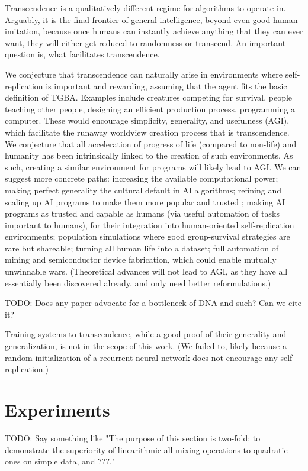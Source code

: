 \documentclass{article}
\begin{document}
Transcendence is a qualitatively different regime for algorithms to operate in. Arguably, it is the final frontier of general intelligence, beyond even good human imitation, because once humans can instantly achieve anything that they can ever want, they will either get reduced to randomness or transcend. An important question is, what facilitates transcendence.

We conjecture that transcendence can naturally arise in environments where self-replication is important and rewarding, assuming that the agent fits the basic definition of TGBA. Examples include creatures competing for survival, people teaching other people, designing an efficient production process, programming a computer. These would encourage simplicity, generality, and usefulness (AGI), which facilitate the runaway worldview creation process that is transcendence. We conjecture that all acceleration of progress of life (compared to non-life) and humanity has been intrinsically linked to the creation of such environments. As such, creating a similar environment for programs will likely lead to AGI. We can suggest more concrete paths: increasing the available computational power; making perfect generality the cultural default in AI algorithms; refining and scaling up AI programs to make them more popular and trusted \cite{NEURIPS2020_1457c0d6}; making AI programs as trusted and capable as humans (via useful automation of tasks important to humans), for their integration into human-oriented self-replication environments; population simulations where good group-survival strategies are rare but shareable; turning all human life into a dataset; full automation of mining and semiconductor device fabrication, which could enable mutually unwinnable wars. (Theoretical advances will not lead to AGI, as they have all essentially been discovered already, and only need better reformulations.)

    TODO: Does any paper advocate for a bottleneck of DNA and such? Can we cite it?

Training systems to transcendence, while a good proof of their generality and generalization, is not in the scope of this work. (We failed to, likely because a random initialization of a recurrent neural network does not encourage any self-replication.)

\section{Experiments}

    TODO: Say something like "The purpose of this section is two-fold: to demonstrate the superiority of linearithmic all-mixing operations to quadratic ones on simple data, and ???."
\end{document}
